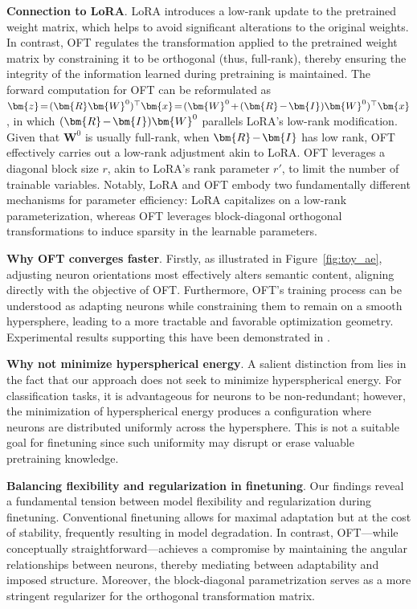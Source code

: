 \textbf{Connection to LoRA}. LoRA introduces a low-rank update to the pretrained weight matrix, which helps to avoid significant alterations to the original weights. In contrast, OFT regulates the transformation applied to the pretrained weight matrix by constraining it to be orthogonal (thus, full-rank), thereby ensuring the integrity of the information learned during pretraining is maintained. The forward computation for OFT can be reformulated as $\thickmuskip=2mu \medmuskip=2mu \bm{z}=(\bm{R}\bm{W}^0)^\top\bm{x}=(\bm{W}^0+(\bm{R}-\bm{I})\bm{W}^0)^\top\bm{x}$, in which $\thickmuskip=2mu \medmuskip=2mu (\bm{R}-\bm{I})\bm{W}^0$ parallels LoRA’s low-rank modification. Given that $\bm{W}^0$ is usually full-rank, when $\thickmuskip=2mu \medmuskip=2mu \bm{R}-\bm{I}$ has low rank, OFT effectively carries out a low-rank adjustment akin to LoRA. OFT leverages a diagonal block size $r$, akin to LoRA’s rank parameter $r'$, to limit the number of trainable variables. Notably, LoRA and OFT embody two fundamentally different mechanisms for parameter efficiency: LoRA capitalizes on a low-rank parameterization, whereas OFT leverages block-diagonal orthogonal transformations to induce sparsity in the learnable parameters.

\textbf{Why OFT converges faster}. Firstly, as illustrated in Figure~\ref{fig:toy_ae}, adjusting neuron orientations most effectively alters semantic content, aligning directly with the objective of OFT. Furthermore, OFT’s training process can be understood as adapting neurons while constraining them to remain on a smooth hypersphere, leading to a more tractable and favorable optimization geometry. Experimental results supporting this have been demonstrated in \cite{liu2021orthogonal}.

\textbf{Why not minimize hyperspherical energy}. A salient distinction from \cite{liu2021orthogonal} lies in the fact that our approach does not seek to minimize hyperspherical energy. For classification tasks, it is advantageous for neurons to be non-redundant; however, the minimization of hyperspherical energy produces a configuration where neurons are distributed uniformly across the hypersphere. This is not a suitable goal for finetuning since such uniformity may disrupt or erase valuable pretraining knowledge.

\textbf{Balancing flexibility and regularization in finetuning}. Our findings reveal a fundamental tension between model flexibility and regularization during finetuning. Conventional finetuning allows for maximal adaptation but at the cost of stability, frequently resulting in model degradation. In contrast, OFT—while conceptually straightforward—achieves a compromise by maintaining the angular relationships between neurons, thereby mediating between adaptability and imposed structure. Moreover, the block-diagonal parametrization serves as a more stringent regularizer for the orthogonal transformation matrix.

